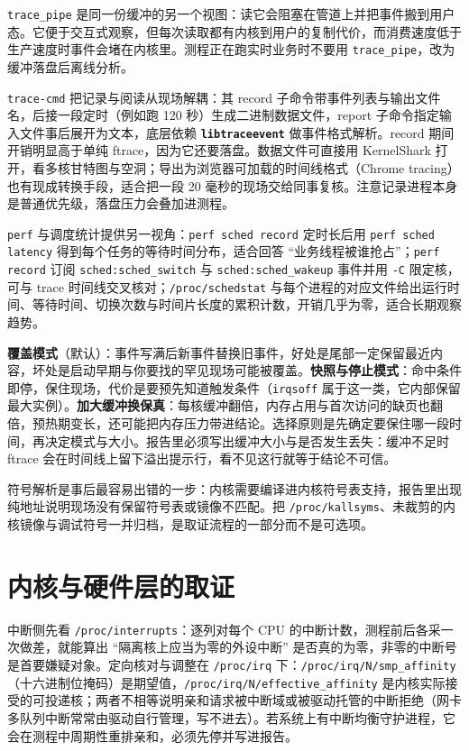 \documentclass[12pt,a4paper,fontset=fandol]{ctexbook}
\newcommand{\Tp}[1]{\texttt{#1}}
\newcommand{\Bk}{\discretionary{}{}{}}
\newcommand{\Lib}[1]{\textbf{\texttt{#1}}}
\begin{document}
\Tp{trace\_pipe} 是同一份缓冲的另一个视图：读它会阻塞在管道上并把事件搬到用户态。它便于交互式观察，但每次读取都有内核到用户的复制代价，而消费速度低于生产速度时事件会堵在内核里。测程正在跑实时业务时不要用 \Tp{trace\_pipe}，改为缓冲落盘后离线分析。

\Tp{trace-cmd} 把记录与阅读从现场解耦：其 record 子命令带事件列表与输出文件名，后接一段定时（例如跑 120 秒）生成二进制数据文件，report 子命令指定输入文件事后展开为文本，底层依赖 \Lib{libtraceevent} 做事件格式解析。record 期间开销明显高于单纯 ftrace，因为它还要落盘。数据文件可直接用 KernelShark 打开，看多核甘特图与空洞；导出为浏览器可加载的时间线格式（Chrome tracing）也有现成转换手段，适合把一段 20 毫秒的现场交给同事复核。注意记录进程本身是普通优先级，落盘压力会叠加进测程。

\Tp{perf} 与调度统计提供另一视角：\Tp{perf sched record} 定时长后用 \Tp{perf sched latency} 得到每个任务的等待时间分布，适合回答 ``业务线程被谁抢占''；\Tp{perf record} 订阅 \Tp{sched:sched\_{\Bk}switch} 与 \Tp{sched:sched\_{\Bk}wakeup} 事件并用 \Tp{-C} 限定核，可与 trace 时间线交叉核对；\Tp{/proc/schedstat} 与每个进程的对应文件给出运行时间、等待时间、切换次数与时间片长度的累积计数，开销几乎为零，适合长期观察趋势。

\begin{compare}[title={tracer 即扰动：三种缓冲取舍}]
\textbf{覆盖模式}（默认）：事件写满后新事件替换旧事件，好处是尾部一定保留最近内容，坏处是启动早期与你要找的罕见现场可能被覆盖。\textbf{快照与停止模式}：命中条件即停，保住现场，代价是要预先知道触发条件（\Tp{irqsoff} 属于这一类，它内部保留最大实例）。\textbf{加大缓冲换保真}：每核缓冲翻倍，内存占用与首次访问的缺页也翻倍，预热期变长，还可能把内存压力带进结论。选择原则是先确定要保住哪一段时间，再决定模式与大小。报告里必须写出缓冲大小与是否发生丢失：缓冲不足时 ftrace 会在时间线上留下溢出提示行，看不见这行就等于结论不可信。
\end{compare}

符号解析是事后最容易出错的一步：内核需要编译进内核符号表支持，报告里出现纯地址说明现场没有保留符号表或镜像不匹配。把 \Tp{/proc/kallsyms}、未裁剪的内核镜像与调试符号一并归档，是取证流程的一部分而不是可选项。

\section{内核与硬件层的取证}

中断侧先看 \Tp{/proc/interrupts}：逐列对每个 CPU 的中断计数，测程前后各采一次做差，就能算出 ``隔离核上应当为零的外设中断'' 是否真的为零，非零的中断号是首要嫌疑对象。定向核对与调整在 \Tp{/proc/irq} 下：\Tp{/proc/irq/N/smp\_affinity}（十六进制位掩码）是期望值，\Tp{/proc/irq/N/effective\_affinity} 是内核实际接受的可投递核；两者不相等说明亲和请求被中断域或被驱动托管的中断拒绝（网卡多队列中断常常由驱动自行管理，写不进去）。若系统上有中断均衡守护进程，它会在测程中周期性重排亲和，必须先停并写进报告。
\end{document}
